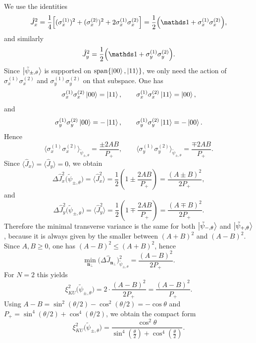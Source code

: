We use the identities
\begin{equation}
	\hat J_x^2
	=
	\frac{1}{4}\Big[(\sigma_x^{(1)})^2+(\sigma_x^{(2)})^2+2\sigma_x^{(1)}\sigma_x^{(2)}\Big]
	=
	\frac{1}{2}\Big(\id+\sigma_x^{(1)}\sigma_x^{(2)}\Big),
\end{equation}
and similarly
\begin{equation}
	\hat J_y^2
	=
	\frac{1}{2}\Big(\id+\sigma_y^{(1)}\sigma_y^{(2)}\Big).
\end{equation}
Since $\ket{\tilde{\psi}_{\pm,\theta}}$ is supported on $\mathrm{span}\{\ket{00},\ket{11}\}$,
we only need the action of $\sigma_x^{(1)}\sigma_x^{(2)}$ and $\sigma_y^{(1)}\sigma_y^{(2)}$ on that subspace.
One has
\begin{equation}
	\sigma_x^{(1)}\sigma_x^{(2)}\ket{00}=\ket{11},
	\qquad
	\sigma_x^{(1)}\sigma_x^{(2)}\ket{11}=\ket{00},
\end{equation}
and
\begin{equation}
	\sigma_y^{(1)}\sigma_y^{(2)}\ket{00}=-\ket{11},
	\qquad
	\sigma_y^{(1)}\sigma_y^{(2)}\ket{11}=-\ket{00}.
\end{equation}
Hence
\begin{equation}
	\langle \sigma_x^{(1)}\sigma_x^{(2)}\rangle_{\tilde{\psi}_{\pm,\theta}}
	=
	\frac{\pm 2AB}{P_+},
	\qquad
	\langle \sigma_y^{(1)}\sigma_y^{(2)}\rangle_{\tilde{\psi}_{\pm,\theta}}
	=
	\frac{\mp 2AB}{P_+}.
\end{equation}
Since $\langle \hat J_x\rangle=\langle \hat J_y\rangle=0$, we obtain
\begin{equation}
	\Delta \hat J_x^2\big(\tilde{\psi}_{\pm,\theta}\big)
	=
	\langle \hat J_x^2\rangle
	=
	\frac{1}{2}\left(1\pm \frac{2AB}{P_+}\right)
	=
	\frac{(A\pm B)^2}{2P_+},
\end{equation}
and
\begin{equation}
	\Delta \hat J_y^2\big(\tilde{\psi}_{\pm,\theta}\big)
	=
	\langle \hat J_y^2\rangle
	=
	\frac{1}{2}\left(1\mp \frac{2AB}{P_+}\right)
	=
	\frac{(A\mp B)^2}{2P_+}.
\end{equation}
Therefore the minimal transverse variance is the same for both $\ket{\tilde{\psi}_{-,\theta}}$ and
$\ket{\tilde{\psi}_{+,\theta}}$, because it is always given by the smaller between $(A+B)^2$ and $(A-B)^2$.
Since $A,B\ge 0$, one has $(A-B)^2\le (A+B)^2$, hence
\begin{equation}
	\min_{\mathbf{n}_\perp}\big(\Delta \hat J_{\mathbf{n}_\perp}\big)^2_{\tilde{\psi}_{\pm,\theta}}
	=
	\frac{(A-B)^2}{2P_+}.
\end{equation}
For $N=2$ this yields
\begin{equation}
	\xi_{KU}^2\big(\tilde{\psi}_{\pm,\theta}\big)
	=
	2\cdot \frac{(A-B)^2}{2P_+}
	=
	\frac{(A-B)^2}{P_+}.
	\label{eq:xi_even_click_general_AB}
\end{equation}
Using $A-B=\sin^{2}(\theta/2)-\cos^{2}(\theta/2)=-\cos\theta$ and $P_+=\sin^{4}(\theta/2)+\cos^{4}(\theta/2)$,
we obtain the compact form
\begin{equation}
	\xi_{KU}^2\big(\tilde{\psi}_{\pm,\theta}\big)
	=
	\frac{\cos^{2}\theta}{\sin^{4}\!\left(\frac{\theta}{2}\right)+\cos^{4}\!\left(\frac{\theta}{2}\right)}.
	\label{eq:xi_even_click_theta}
\end{equation}

